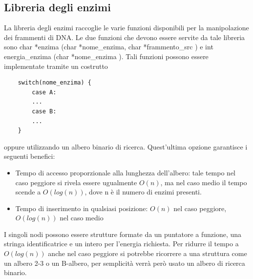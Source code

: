 \documentclass[a4paper,10pt]{article}
\begin{document}
\subsection{Libreria degli enzimi}
La libreria degli enzimi raccoglie le varie funzioni disponibili per la manipolazione dei frammenti di DNA.
Le due funzioni che devono essere servite da tale libreria sono char *enzima (char *nome\_{}enzima, char *frammento\_{}src ) e int energia\_{}enzima (char *nome\_{}enzima ).
Tali funzioni possono essere implementate tramite un costrutto \begin{verbatim}
    switch(nome_enzima) {
        case A:
        ...
        case B:
        ...
    }
\end{verbatim} oppure utilizzando un albero binario di ricerca. Quest'ultima opzione garantisce i seguenti benefici:
\begin{itemize}
\item Tempo di accesso proporzionale alla lunghezza dell'albero: tale tempo nel caso peggiore si rivela essere ugualmente $O(n)$, ma nel caso medio il tempo scende a $O(log(n))$, dove n è il numero di enzimi presenti.
\item Tempo di inserimento in qualsiasi posizione: $O(n)$ nel caso peggiore, $O(log(n))$ nel caso medio
\end{itemize} I singoli nodi possono essere strutture formate da un puntatore a funzione, una stringa identificatrice e un intero per l'energia richiesta.
Per ridurre il tempo a $O(log(n))$ anche nel caso peggiore si potrebbe ricorrere a una struttura come un albero 2-3 o un B-albero, per semplicità verrà però usato un albero di ricerca binario.
\end{document}
